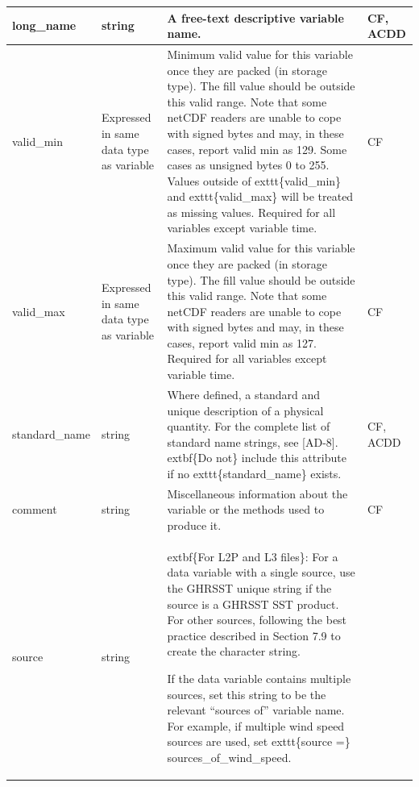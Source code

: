 \begin{longtable}{|p{}|p{}|p{}|p{}|}
\rowcolor{LightCyan} long\_name & string & A free-text descriptive variable name. & CF, ACDD \\ \hline

\rowcolor{LightCyan} valid\_min & Expressed in same data type as variable & Minimum valid value for this variable once they are packed (in storage type). The fill value should be outside this valid range. Note that some netCDF readers are unable to cope with signed bytes and may, in these cases, report valid min as 129. Some cases as unsigned bytes 0 to 255. Values outside of \hspace{0.5cm}exttt\{valid\_min\} and \hspace{0.5cm}exttt\{valid\_max\} will be treated as missing values. Required for all variables except variable time. & CF \\ \hline

\rowcolor{LightCyan} valid\_max & Expressed in same data type as variable & Maximum valid value for this variable once
they are packed (in storage type). The fill
value should be outside this valid range. Note
that some netCDF readers are unable to cope
with signed bytes and may, in these cases,
report valid min as 127. Required for all
variables except variable time. & CF \\ \hline

\rowcolor{LightCyan} standard\_name & string & Where defined, a standard and unique
description of a physical quantity. For the
complete list of standard name strings, see
[AD-8]. \hspace{0.5cm}extbf\{Do not\} include this attribute if no
\hspace{0.5cm}exttt\{standard\_name\} exists. & CF, ACDD \\ \hline

\rowcolor{LightCyan} comment & string & Miscellaneous information about the variable or the methods used to produce it. & CF \\ \hline

\rowcolor{LightCyan} source & string & \hspace{0.5cm}extbf\{For L2P and L3 files\}: For a data variable with
a single source, use the GHRSST unique
string if the source is a
GHRSST SST product. For other sources,
following the best practice described in
Section 7.9 to create the character string.

If the data variable contains multiple sources,
set this string to be the relevant “sources of”
variable name. For example, if multiple wind
speed sources are used, set \hspace{0.5cm}exttt\{source =\}
sources\_of\_wind\_speed.


\end{longtable}
